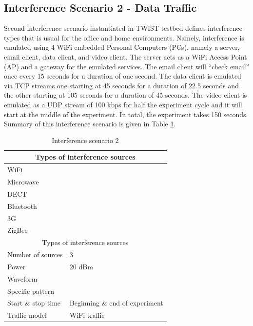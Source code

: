\documentclass[11pt,a4paper,headinclude,footinclude,chapterprefix=on]{scrreprt}
\begin{document}
\subsection{Interference Scenario 2 - Data Traffic}\label{scene:int:2} 
Second interference scenario instantiated in TWIST testbed defines interference types that is usual for the office and home environments. Namely, interference is emulated using 4 WiFi embedded Personal Computers (PCs), namely a server, email client, data client, and video client. The server acts as a WiFi Access Point (AP) and a gateway for the emulated services. The email client will “check email” once every 15 seconds for a duration of one second. The data client is emulated via TCP streams one starting at 45 seconds for a duration of 22.5 seconds and the other starting at 105 seconds for a duration of 45 seconds. The video client is emulated as a UDP stream of 100 kbps for half the experiment cycle and it will start at the middle of the experiment. In total, the experiment takes 150 seconds. Summary of this interference scenario is given in Table \ref{tb:interf:3}. 
\begin{table}
	[h] \centering \caption{Interference scenario 2} \label{tb:interf:3} 
	\begin{tabular}
		{|l|l|} \hline \multicolumn{2}{|c|}{Types of interference sources} \\
		\hline WiFi & \checkmark \\
		Microwave & \texttimes \\
		DECT & \texttimes \\
		Bluetooth & \texttimes \\
		3G & \texttimes \\
		ZigBee & \texttimes \\
		\hline \multicolumn{2}{|c|}{Types of interference sources} \\
		\hline Number of sources & 3 \\
		Power & 20 dBm \\
		Waveform & \\
		Specific pattern & \\
		Start \& stop time & Beginning \& end of experiment \\
		Traffic model & WiFi traffic \\
		\hline 
	\end{tabular}
\end{table}

\end{document}
